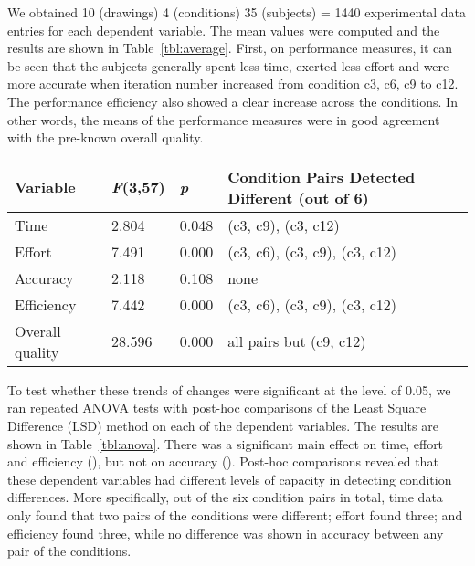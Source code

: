 \documentclass[conference,letterpaper]{IEEEtran}
\begin{document}
We obtained 10 (drawings)  4 (conditions)  35 (subjects) = 1440 experimental data entries for each dependent variable. The mean values were computed  and the results are shown in Table~\ref{tbl:average}. First, on performance measures, it can be seen that the subjects generally spent less time, exerted less effort and were more accurate when iteration number increased from condition c3, c6, c9 to c12. The performance efficiency also showed a clear increase across the conditions. In other words, the means of the performance measures were in good agreement with the pre-known overall quality.



 
 
 \begin{table*}[!t]
\renewcommand{\arraystretch}{1.3}

\caption{Results of ANOVA with Post-Hoc Comparisons  }
\label{tbl:anova}
\centering
\begin{tabular}{l|l|l|l}

\hline
Variable & \emph{F}(3,57)  & \emph{p} & Condition Pairs Detected Different (out of 6)\\
\hline
\hline
 Time        &  2.804  &0.048        &(c3, c9), (c3, c12)   \\
 Effort      &   7.491 &0.000     & (c3, c6), (c3, c9), (c3, c12)\\
 Accuracy    &   2.118 &0.108        & none \\
 Efficiency  &   7.442 &0.000     & (c3, c6), (c3, c9), (c3, c12)  \\
\hline
 Overall quality  &  28.596 &0.000& all pairs but (c9, c12) \\
\hline
\end{tabular}
\end{table*}

To test whether these trends of changes were significant at the level of 0.05, we ran repeated ANOVA tests with post-hoc comparisons of the Least Square Difference (LSD) method on each of the dependent variables. The results are shown in Table~\ref{tbl:anova}. There was a significant main effect on time, effort and efficiency (), but not on accuracy (). Post-hoc comparisons revealed that these dependent variables had different levels of capacity in detecting condition differences. More specifically, out of the six condition pairs in total, time data only found that two pairs of the conditions were different; effort found three; and efficiency found three, while no difference was shown in accuracy between any pair of the conditions.
 
\end{document}
